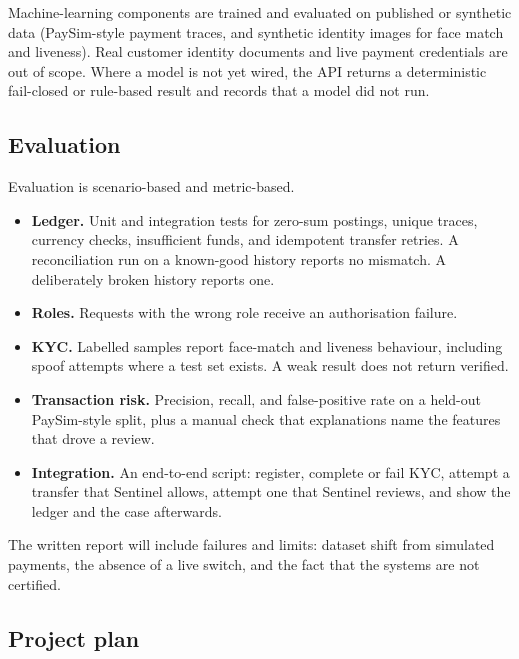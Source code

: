 \documentclass[12pt,a4paper]{article}
\begin{document}
Machine-learning components are trained and evaluated on published or synthetic data (PaySim-style payment traces, and synthetic identity images for face match and liveness). Real customer identity documents and live payment credentials are out of scope. Where a model is not yet wired, the API returns a deterministic fail-closed or rule-based result and records that a model did not run.

\subsection{Evaluation}

Evaluation is scenario-based and metric-based.

\begin{itemize}
  \item \textbf{Ledger.} Unit and integration tests for zero-sum postings, unique traces, currency checks, insufficient funds, and idempotent transfer retries. A reconciliation run on a known-good history reports no mismatch. A deliberately broken history reports one.
  \item \textbf{Roles.} Requests with the wrong role receive an authorisation failure.
  \item \textbf{KYC.} Labelled samples report face-match and liveness behaviour, including spoof attempts where a test set exists. A weak result does not return verified.
  \item \textbf{Transaction risk.} Precision, recall, and false-positive rate on a held-out PaySim-style split, plus a manual check that explanations name the features that drove a review.
  \item \textbf{Integration.} An end-to-end script: register, complete or fail KYC, attempt a transfer that Sentinel allows, attempt one that Sentinel reviews, and show the ledger and the case afterwards.
\end{itemize}

The written report will include failures and limits: dataset shift from simulated payments, the absence of a live switch, and the fact that the systems are not certified.

\subsection{Project plan}
\end{document}
